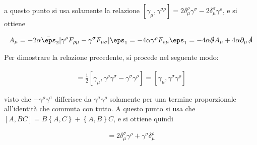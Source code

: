 \documentclass{report}
\begin{document}
a questo punto si usa solamente la relazione \([\gamma_\mu, \gamma^{\sigma\rho}] = 2\delta^\rho_\mu \gamma^\sigma - 2\delta^\sigma_\mu \gamma^\rho \), e si ottiene 

\begin{align}
    [\delta_{\eps_1}, \delta_{\eps_2}]A_\mu = -2\alpha \bar{\eps}_2 [\gamma^\rho F_{\rho \mu} - \gamma^{\sigma}F_{\mu\sigma}]\eps_1 = -4\alpha \gamma^\rho F_{\rho \mu}\eps_1 = -4\alpha \slashed{\partial}A_\mu + 4\alpha \partial_\mu \slashed{A}
\end{align}

Per dimostrare la relazione precedente, si procede nel seguente modo: 

\begin{align}
    [\gamma_\mu, \gamma^{\rho\sigma}] = \frac{1}{2}[\gamma_\mu, \gamma^\rho \gamma^\sigma - \gamma^{\sigma}\gamma^{\rho}] = [\gamma_\mu, \gamma^\sigma\gamma^\rho]
\end{align}

visto che \(-\gamma^\rho\gamma^\sigma\) differisce da \(\gamma^\sigma \gamma^\rho\) solamente per una termine proporzionale all'identità che commuta con tutto. A questo punto si usa che \([A, BC] = B\left\{ A, C \right\} + \left\{ A, B \right\}C\), e si ottiene quindi 

\begin{align}
    [\gamma_\mu, \gamma^{\rho\sigma}] = 2\delta^\sigma_\mu \gamma^\rho + \gamma^\sigma \delta^\rho_\mu
\end{align}
\end{document}
